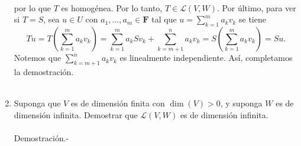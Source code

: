 \begin{enumerate}[\bfseries 1.]
$$\begin{array}{rcl}
	\end{array}
	$$
	por lo que $T$ es homogénea. Por lo tanto, $T\in \mathcal{L}(V,W)$. Por último, para ver si $T=S$, sea $u\in U$ con $a_1,\ldots,a_m\in \textbf{F}$ tal que $u=\sum_{k=1}^m a_kv_k$ se tiene
	$$Tu=T\left(\displaystyle\sum_{k=1}^m a_kv_k\right)=\displaystyle\sum_{k=1}^m a_kSv_k+\displaystyle\sum_{k=m+1}^n a_kv_k=S\left(\displaystyle\sum_{k=1}^m a_kv_k\right)=Su.$$
	Notemos que $\sum_{k=m+1}^n a_kv_k$ es linealmente independiente. Así, completamos la demostración.\\\\

    \item Suponga que $V$ es de dimensión finita con $\dim(V)>0$, y suponga $W$ es de dimensión infinita. Demostrar que $\mathcal{L}(V,W)$ es de dimensión infinita.\\\\
	Demostración.-\; 

\end{enumerate}
